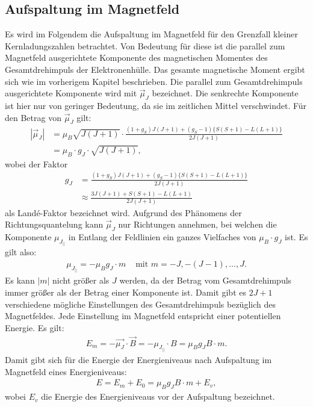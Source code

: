 \subsection{Aufspaltung im Magnetfeld}
Es wird im Folgendem die Aufspaltung im Magnetfeld für den Grenzfall kleiner Kernladungszahlen betrachtet. Von Bedeutung für diese ist die parallel zum Magnetfeld ausgerichtete Komponente des magnetischen Momentes des Gesamtdrehimpuls der Elektronenhülle. Das gesamte magnetische Moment ergibt sich wie im vorherigem Kapitel beschrieben. Die parallel zum Gesamtdrehimpuls ausgerichtete Komponente wird mit $\vec{\mu}_J$ bezeichnet. Die senkrechte Komponente ist hier nur von geringer Bedeutung, da sie im zeitlichen Mittel verschwindet. Für den Betrag von $\vec{\mu}_J$ gilt:
\begin{align*}
	|\vec{\mu}_J|&=\mu_B \sqrt{J(J+1)} \cdot \frac{(1+g_S) J (J+1) + (g_S-1)\{S(S+1)-L(L+1)\}}{2 J (J+1)}\\
	&= \mu_B\cdot g_J \cdot\sqrt{J(J+1)},
\end{align*}
wobei der Faktor 
\begin{align*}
	g_J&=\frac{(1+g_S) J (J+1) + (g_S-1)\{S(S+1)-L(L+1)\}}{2 J (J+1)}\\
	&\approx \frac{3 J (J+1) + S(S+1)-L(L+1)}{2 J (J+1)}
\end{align*}
als Landé-Faktor bezeichnet wird. Aufgrund des Phänomens der Richtungsquantelung kann $\vec{\mu}_J$ nur Richtungen annehmen, bei welchen die Komponente $\mu_{J_{||}}$ in Entlang der Feldlinien ein ganzes Vielfaches von $\mu_B \cdot g_J$ ist. Es gilt also:
\begin{align*}
	\mu_{J_{||}}=-\mu_B g_J  \cdot m & \text{ mit } m=-J,-(J-1), \hdots, J.
\end{align*}
Es kann $|m|$ nicht größer als $J$ werden, da der Betrag vom Gesamtdrehimpuls immer größer als der Betrag einer Komponente ist. Damit gibt es $2 J +1 $ verschiedene mögliche Einstellungen des Gesamtdrehimpuls bezüglich des Magnetfeldes. Jede Einstellung im Magnetfeld entspricht einer potentiellen Energie. Es gilt:
\begin{gather*}
	E_{m}=-\vec{\mu_{J}} \cdot \vec{B} = -\mu_{J_{||}} \cdot B= \mu_B g_J B \cdot m.
\end{gather*}
Damit gibt sich für die Energie der Energieniveaus nach Aufspaltung im Magnetfeld eines Energieniveaus:
\begin{gather}
	E=E_{m}+E_0=\mu_B g_J B \cdot m +E_v, \label{eq:ENiveau}
\end{gather}
wobei $E_v$ die Energie des Energieniveaus vor der Aufspaltung bezeichnet.
